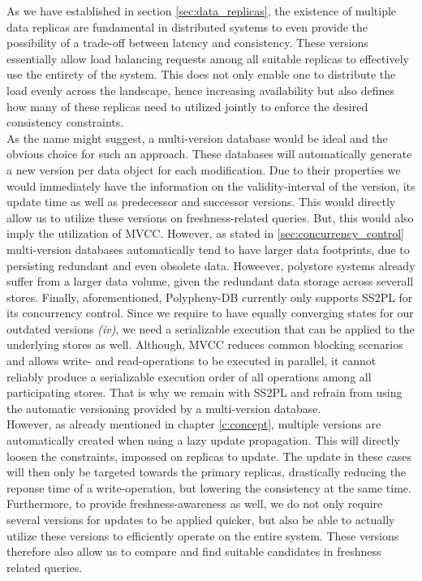 As we have established in section \ref{sec:data_replicas}, the existence of multiple data replicas are fundamental in distributed systems to even provide the 
possibility of a trade-off between latency and consistency. These versions essentially allow load balancing requests among all suitable replicas to effectively 
use the entirety of the system. This does not only enable one to distribute the load evenly across the landscape, hence increasing availability
but also defines how many of these replicas need to utilized jointly to enforce the desired consistency constraints.\\

As the name might suggest, a multi-version database would be ideal and the obvious choice for such an approach.
These databases will automatically generate a new version per data object for each modification. 
Due to their properties we would immediately have the information on the validity-interval of the version, its update time as well as predecessor and successor versions.
This would directly allow us to utilize these versions on freshness-related queries. But, this would also imply the utilization of MVCC.
However, as stated in \ref{sec:concurrency_control} multi-version databases automatically tend to have larger data footprints, due to persisting  
redundant and even obsolete data.
Howeever, polystore systems already suffer from a larger data volume, given the redundant data storage across severall stores.
Finally, aforementioned, Polypheny-DB currently only supports SS2PL for its concurrency control.
Since we require to have equally converging states for our outdated versions \textit{(iv)}, we need a serializable execution that can be applied to 
the underlying stores as well.
Although, MVCC reduces common blocking scenarios and allows write- and read-operations to be executed in parallel, 
it cannot reliably produce a serializable execution order of all operations among all participating stores.
That is why we remain with SS2PL and refrain from using the automatic versioning provided by a multi-version database.\\

However, as already mentioned in chapter \ref{c:concept}, multiple versions are automatically created when using a lazy update propagation. 
This will directly loosen the constraints, impossed on replicas to update. 
The update in these cases will then only be targeted towards the primary replicas, drastically reducing the reponse time of a write-operation,
but lowering the consistency at the same time.  
Furthermore, to provide freshness-awareness as well, we do not only require several versions for updates to be applied quicker,
but also be able to actually utilize these versions to efficiently operate on the entire system.
These versions therefore also allow us to compare and find suitable candidates in freshness related queries.\\

